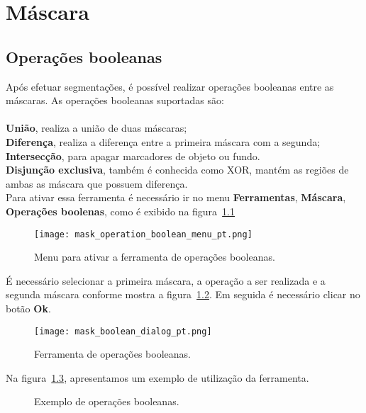 \chapter{Máscara}


\section{Operações booleanas}

Após efetuar segmentações, é possível realizar operações booleanas entre as máscaras. As operações booleanas suportadas são:\\
\\
\textbf{União}, realiza a união de duas máscaras;\\
\textbf{Diferença}, realiza a diferença entre a primeira máscara com a segunda;\\
\textbf{Intersecção}, para apagar marcadores de objeto ou fundo.\\
\textbf{Disjunção exclusiva}, também é conhecida como XOR, mantém as regiões de ambas as máscara que possuem diferença.\\

Para ativar essa ferramenta é necessário ir no menu \textbf{Ferramentas}, \textbf{Máscara}, \textbf{Operações boolenas}, como é exibido na figura~\ref{fig:booleano_menu} 

\begin{figure}[!htb]
\centering
\texttt{[image: mask\_operation\_boolean\_menu\_pt.png]}
\caption{Menu para ativar a ferramenta de operações booleanas.}
\label{fig:booleano_menu}
\end{figure}

É necessário selecionar a primeira máscara, a operação a ser realizada e a segunda máscara conforme mostra a figura~\ref{fig:booleano_janela}. Em seguida é necessário clicar no botão \textbf{Ok}.

\begin{figure}[!htb]
\centering
\texttt{[image: mask\_boolean\_dialog\_pt.png]}
\caption{Ferramenta de operações booleanas.}
\label{fig:booleano_janela}
\end{figure}

Na figura~\ref{fig:op_boolana}, apresentamos um exemplo de utilização da ferramenta.

\begin{figure}[!htb]
  \centering
  \hfill
  \hfill  
  \hfill  
  \hfill  
  \hfill  
  \caption{Exemplo de operações booleanas.}
  \label{fig:op_boolana}
\end{figure}


